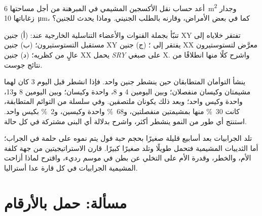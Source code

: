 \begin{exercise}[$\star\star$]\label{exo:b2:mammal-reproduction:9}
أعد حساب نقل الأكسجين المشيمي في المبرهنة من أجل
 مساحتها \qty{6}{m^2} وجدار زغاباتها \qty{10}{\micro m}، كما
في بعض الأمراض، وقارنه بالطلب الجنيني. وماذا يحدث
للجنين؟
\end{exercise}

\begin{exercise}[$\star\star\star$]\label{exo:b2:mammal-reproduction:10}
تنبّأ بجملة القنوات والأعضاء التناسلية الخارجية عند: (أ) جنين XY
تفتقر خلاياه إلى مستقبل التستوستيرون؛ (ب) جنين XY يفتقر إلى
؛ (ج) جنين XX معرَّض لتستوستيرون عالٍ
من كظريه؛ (د) جنين XX يحمل \emph{SRY} على صبغي
X. واشرح كلًا منها انطلاقًا من نتائج جوست.
\end{exercise}

\begin{exercise}[$\star\star\star$]\label{exo:b2:mammal-reproduction:11}
ينشأ التوأمان المتطابقان حين ينشطر جنين واحد. فإذا انشطر قبل
اليوم 3 كان لهما مشيمتان وكيسان منفصلان؛ وبين اليومين 4 و
8،  واحدة وكيسان؛ وبين اليومين 8 و13،  واحدة وكيس
واحد؛ وبعد ذلك يكونان ملتصقين. وفي سلسلة من التوائم المتطابقة،
كانت \qty{30}{\%} منها بمشيمتين منفصلتين، و\qty{68}{\%}  واحدة
وكيسين، و\qty{2}{\%} بكيس واحد. استنتج أي طور من النمو
ينشطر أكثر، واشرح بدلالة  أي البنى
مشتركة في كل حالة.
\end{exercise}

\begin{exercise}[$\star\star\star$]\label{exo:b2:mammal-reproduction:12}
تلد الجرابيات بعد أسابيع قليلة صغيرًا بحجم حبة فول
يتم نموه على حلمة في الجراب؛ أما الثدييات المشيمية
فتحمل طويلًا وتلد صغيرًا كبيرًا. قارن الاستراتيجيتين من جهة
كلفة الأم، والخطر، وقدرة الأم على التخلي عن بطن في موسم رديء،
واقترح لماذا أزاحت المشيمية الجرابيات في كل قارة عدا
أستراليا.
\end{exercise}

\section{مسألة: حمل بالأرقام}

